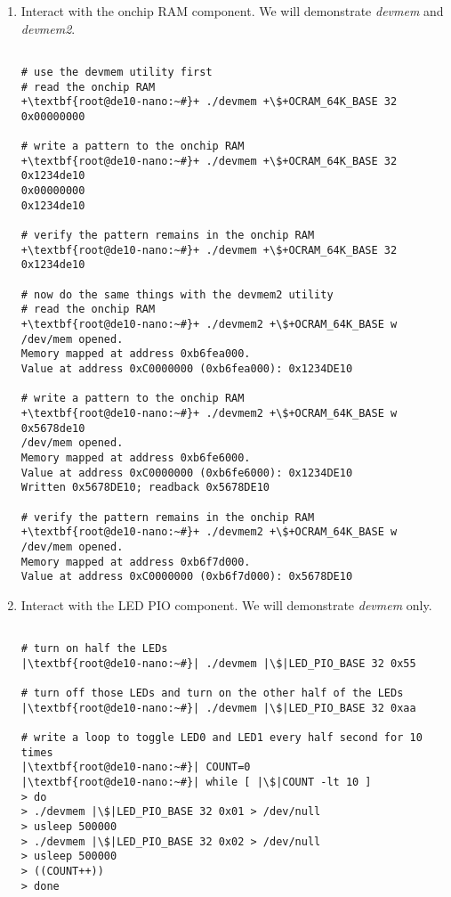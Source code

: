 \begin{flushleft}
\begin{enumerate}[
	label=\textbf{Step \arabic*.},
	leftmargin=*,
	widest={00},
	align=left]
\begin{enumerate}[
	label=\textbf{Step \arabic{enumi}\alph*.},
	leftmargin=*,
	align=left]

\item Interact with the onchip RAM component.  We will demonstrate \emph{devmem} and \emph{devmem2}.

\begin{verbatim}

# use the devmem utility first
# read the onchip RAM
+\textbf{root@de10-nano:~#}+ ./devmem +\$+OCRAM_64K_BASE 32
0x00000000

# write a pattern to the onchip RAM
+\textbf{root@de10-nano:~#}+ ./devmem +\$+OCRAM_64K_BASE 32 0x1234de10
0x00000000
0x1234de10

# verify the pattern remains in the onchip RAM
+\textbf{root@de10-nano:~#}+ ./devmem +\$+OCRAM_64K_BASE 32
0x1234de10

# now do the same things with the devmem2 utility
# read the onchip RAM
+\textbf{root@de10-nano:~#}+ ./devmem2 +\$+OCRAM_64K_BASE w
/dev/mem opened.
Memory mapped at address 0xb6fea000.
Value at address 0xC0000000 (0xb6fea000): 0x1234DE10

# write a pattern to the onchip RAM
+\textbf{root@de10-nano:~#}+ ./devmem2 +\$+OCRAM_64K_BASE w 0x5678de10
/dev/mem opened.
Memory mapped at address 0xb6fe6000.
Value at address 0xC0000000 (0xb6fe6000): 0x1234DE10
Written 0x5678DE10; readback 0x5678DE10

# verify the pattern remains in the onchip RAM
+\textbf{root@de10-nano:~#}+ ./devmem2 +\$+OCRAM_64K_BASE w
/dev/mem opened.
Memory mapped at address 0xb6f7d000.
Value at address 0xC0000000 (0xb6f7d000): 0x5678DE10

\end{verbatim}

\item Interact with the LED PIO component.  We will demonstrate \emph{devmem} only.

\begin{verbatim}

# turn on half the LEDs
|\textbf{root@de10-nano:~#}| ./devmem |\$|LED_PIO_BASE 32 0x55

# turn off those LEDs and turn on the other half of the LEDs
|\textbf{root@de10-nano:~#}| ./devmem |\$|LED_PIO_BASE 32 0xaa

# write a loop to toggle LED0 and LED1 every half second for 10 times
|\textbf{root@de10-nano:~#}| COUNT=0
|\textbf{root@de10-nano:~#}| while [ |\$|COUNT -lt 10 ]
> do
> ./devmem |\$|LED_PIO_BASE 32 0x01 > /dev/null
> usleep 500000
> ./devmem |\$|LED_PIO_BASE 32 0x02 > /dev/null
> usleep 500000
> ((COUNT++))
> done


\end{verbatim}
\end{enumerate}
\end{enumerate}
\end{flushleft}
